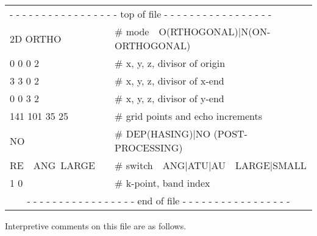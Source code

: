 \documentclass[10pt,fleqn,a4paper,twosided]{article}
\begin{document}
\vspace*{.25cm}
{\tt \begin{tabular}{lll}
\multicolumn{3}{l}{
- - - - - - - - - - - - - - - - - top of file - - - - - - - - - - - - - - - - -}\\[-.0ex]
2D ORTHO         & & \textmd{\#} mode\ \ O(RTHOGONAL)|N(ON-ORTHOGONAL) \\[-.0ex]
0 0 0 2          & & \textmd{\#} x, y, z, divisor of origin \\[-.0ex]
3 3 0 2          & & \textmd{\#} x, y, z, divisor of x-end \\[-.0ex]
0 0 3 2          & & \textmd{\#} x, y, z, divisor of y-end \\[-.0ex]
141 101 35 25    & & \textmd{\#} grid points and echo increments \\[-.0ex]
NO               & & \textmd{\#} DEP(HASING)|NO (POST-PROCESSING) \\[-.0ex]
RE\ \ ANG\ LARGE & & \textmd{\#} switch\ \ ANG|ATU|AU\ \ LARGE|SMALL \\[-.0ex]
1 0              & \hspace*{1.5cm} & \textmd{\#} k-point, band index \\[-.0ex]
\multicolumn{3}{c}{
- - - - - - - - - - - - - - - - - end of file - - - - - - - - - - - - - - - - -}\\
\end{tabular}}
\vspace*{.5cm}


Interpretive comments on this file are as follows.
\end{document}
